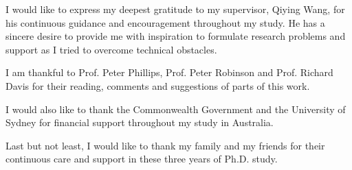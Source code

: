 

\begin{acknowledgements}      %

I would like to express my deepest gratitude to my supervisor, Qiying Wang, for his continuous guidance and encouragement throughout my study. He has a sincere desire to provide me with inspiration to formulate research problems and support as I tried to overcome technical obstacles.

I am thankful to Prof. Peter Phillips, Prof. Peter Robinson and Prof. Richard Davis for their reading, comments and suggestions of parts of this work.

I would also like to thank the Commonwealth Government and the University of Sydney for financial support throughout my study in Australia.

Last but not least, I would like to thank my family and my friends for their continuous care and support in these three years of Ph.D. study.



\end{acknowledgements}


